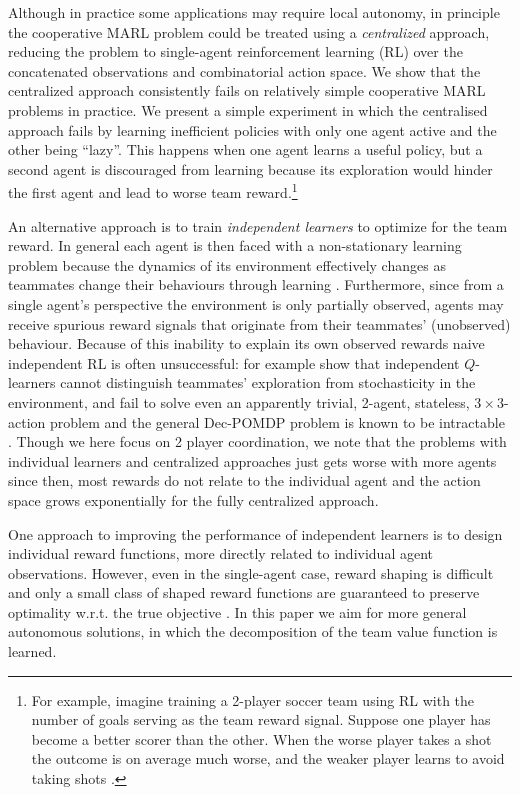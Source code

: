 \documentclass{article}
\begin{document}
Although in practice some applications may require local autonomy, in principle the cooperative MARL problem could be treated using a \emph{centralized} approach, reducing the problem to single-agent reinforcement learning (RL) over the concatenated observations and combinatorial action space. We show that the centralized approach consistently fails on relatively simple cooperative MARL problems in practice. We  present a simple experiment in which the centralised approach fails by learning inefficient policies with only one agent active and the other being ``lazy''. This happens when one agent learns a useful policy, but a second agent is discouraged from learning because its exploration would hinder the first agent and lead to worse team reward.\footnote{For example, imagine training a 2-player soccer team using RL with the number of goals serving as the team reward signal. Suppose one player has become a better scorer than the other. When the worse player takes a shot the outcome is on average much worse, and the weaker player learns to avoid taking shots \citep{HausknechtThesis}.} %

An alternative approach is to train \emph{independent learners} to optimize for the team reward. In general each agent is then faced with a non-stationary learning problem because the dynamics of its environment effectively changes as teammates change their behaviours through learning \citep{Laurent11}. Furthermore, since from a single agent's perspective the environment is only partially observed, agents may receive spurious reward signals that originate from their teammates' (unobserved) behaviour. Because of this inability to explain its own observed rewards naive independent RL is often unsuccessful: for example \citet{ClausBoutillierDynamics} show that independent $Q$-learners cannot distinguish teammates' exploration from stochasticity in the environment, and fail to solve even an apparently trivial, 2-agent, stateless, $3\times 3$-action problem and the general Dec-POMDP problem is known to be intractable \citep{BernsteinDecPomdp,OliehoekAmato16book}. Though we here focus on 2 player coordination, we note that the problems with individual learners and centralized approaches just gets worse with more agents since then, most rewards do not relate to the individual agent and the action space grows exponentially for the fully centralized approach.

One approach to improving the performance of independent learners is to design individual reward functions, more directly related to individual agent observations. However, even in the single-agent case, reward shaping is difficult and only a small class of shaped reward functions are guaranteed to preserve optimality w.r.t. the true objective \citep{NgShaping,tumer-devlin_aamas14,EckSDK16}. In this paper we aim for more general autonomous solutions, in which the decomposition of the team value function is learned.
\end{document}
